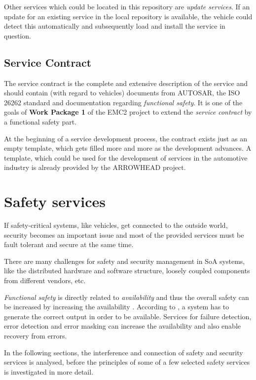 Other services which could be located in this repository are \emph{update services}. If an update for an existing service in the local repository is available, the vehicle could detect this automatically and subsequently load and install the service in question.


\subsection{Service Contract}

The service contract is the complete and extensive description of the service and should contain (with regard to vehicles) documents from AUTOSAR, the ISO 26262 standard and documentation regarding \emph{functional safety}. It is one of the goals of \textbf{Work Package 1} of the EMC2 project to extend the \emph{service contract} by a functional safety part.

At the beginning of a service development process, the contract exists just as an empty template, which gets filled more and more as the development advances. A template, which could be used for the development of services in the automotive industry is already provided by the ARROWHEAD project.








\section{Safety services}

If safety-critical systems, like vehicles, get connected to the outside world, security becomes an important issue and most of the provided services must be fault tolerant and secure at the same time.

There are many challenges for safety and security management in SoA systems, like the distributed hardware and software structure, loosely coupled components from different vendors, etc.

\emph{Functional safety} is directly related to \emph{availability} and thus the overall safety can be increased by increasing the availability \cite{turek2011}. According to \cite{turek2011}, a system has to generate the correct output in order to be available. Services for failure detection, error detection and error masking can increase the availability and also enable recovery from errors.

In the following sections, the interference and connection of safety and security services is analysed, before the principles of some of a few selected safety services is investigated in more detail.

